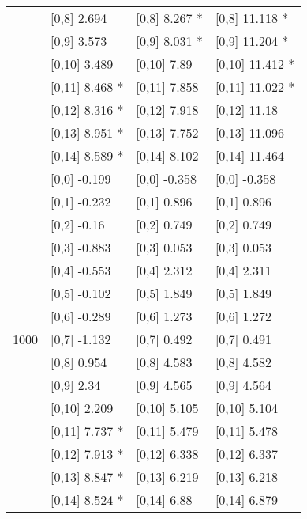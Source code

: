 \begin{table}
\begin{tabular}[t]{llll}
 & {}[0,8] 2.694 & {}[0,8] 8.267 * & {}[0,8] 11.118 *\\
 & {}[0,9] 3.573 & {}[0,9] 8.031 * & {}[0,9] 11.204 *\\
\addlinespace
 & {}[0,10] 3.489 & {}[0,10] 7.89 & {}[0,10] 11.412 *\\
 & {}[0,11] 8.468 * & {}[0,11] 7.858 & {}[0,11] 11.022 *\\
 & {}[0,12] 8.316 * & {}[0,12] 7.918 & {}[0,12] 11.18\\
 & {}[0,13] 8.951 * & {}[0,13] 7.752 & {}[0,13] 11.096\\
 & {}[0,14] 8.589 * & {}[0,14] 8.102 & {}[0,14] 11.464\\
\addlinespace
 & {}[0,0] -0.199 & {}[0,0] -0.358 & {}[0,0] -0.358\\
 & {}[0,1] -0.232 & {}[0,1] 0.896 & {}[0,1] 0.896\\
 & {}[0,2] -0.16 & {}[0,2] 0.749 & {}[0,2] 0.749\\
 & {}[0,3] -0.883 & {}[0,3] 0.053 & {}[0,3] 0.053\\
 & {}[0,4] -0.553 & {}[0,4] 2.312 & {}[0,4] 2.311\\
\addlinespace
 & {}[0,5] -0.102 & {}[0,5] 1.849 & {}[0,5] 1.849\\
 & {}[0,6] -0.289 & {}[0,6] 1.273 & {}[0,6] 1.272\\
1000 & {}[0,7] -1.132 & {}[0,7] 0.492 & {}[0,7] 0.491\\
 & {}[0,8] 0.954 & {}[0,8] 4.583 & {}[0,8] 4.582\\
 & {}[0,9] 2.34 & {}[0,9] 4.565 & {}[0,9] 4.564\\
\addlinespace
 & {}[0,10] 2.209 & {}[0,10] 5.105 & {}[0,10] 5.104\\
 & {}[0,11] 7.737 * & {}[0,11] 5.479 & {}[0,11] 5.478\\
 & {}[0,12] 7.913 * & {}[0,12] 6.338 & {}[0,12] 6.337\\
 & {}[0,13] 8.847 * & {}[0,13] 6.219 & {}[0,13] 6.218\\
 & {}[0,14] 8.524 * & {}[0,14] 6.88 & {}[0,14] 6.879\\
\bottomrule
\end{tabular}
\end{table}
